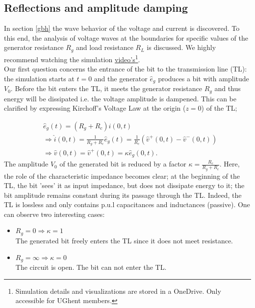 \subsection{Reflections and amplitude damping}

In section \ref{gbh} the wave behavior of the voltage and current is discovered. To this end, the analysis of voltage waves at the boundaries for specific values of the generator resistance $R_g$ and load resistance $R_L$ is discussed. We highly recommend watching the simulation \href{https://ugentbe-my.sharepoint.com/:f:/g/personal/constantijn_coppers_ugent_be/Evlx5Q0EKRhCggn-R1x3NKQBhiF82wRowFP4pT1nCn1ymg?e=Xi2V3R}{video's}\footnote{Simulation details and visualizations are stored in a OneDrive. Only accessible for UGhent members.\label{fn}}. \\

Our first question concerns the entrance of the bit to the transmission line (TL): the simulation starts at $t=0$ and the generator $\hat{e}_g$ produces a bit with amplitude $V_0$. Before the bit enters the TL, it meets the generator resistance $R_g$ and thus energy will be dissipated i.e. the voltage amplitude is dampened. This can be clarified by expressing Kirchoff's Voltage Law at the origin ($z=0$) of the TL;

\begin{align}
&\hat{e}_g(t) = (R_g + R_c)\hat{i}(0, t) \\
&\Rightarrow \hat{i}(0, t) = \frac{1}{R_g+R_c}\hat{e}_g(t)= \frac{1}{R_c}(\hat{v}^{+}(0, t) - \hat{v}^{-}(0, t)) \\
&\Rightarrow \hat{v}(0, t) = \hat{v}^{+}(0, t) =\kappa\hat{e}_g(0, t)\label{enter}.
\end{align}
The amplitude $V_0$ of the generated bit is reduced by a factor $\kappa = \frac{R_c}{R_g + R_c}$. Here, the role of the characteristic impedance becomes clear; at the beginning of the TL, the bit 'sees' it as input impedance, but does not dissipate energy to it; the bit amplitude remains constant during its passage through the TL. Indeed, the TL is lossless and only contains p.u.l capacitances and inductances (passive). One can observe two interesting cases:
\begin{itemize}
\item $R_g = 0 \Rightarrow \kappa = 1$\\ The generated bit freely enters the TL since it does not meet resistance.
\item $R_g = \infty \Rightarrow \kappa = 0$ \\ The circuit is open. The bit can not enter the TL.
\end{itemize}

